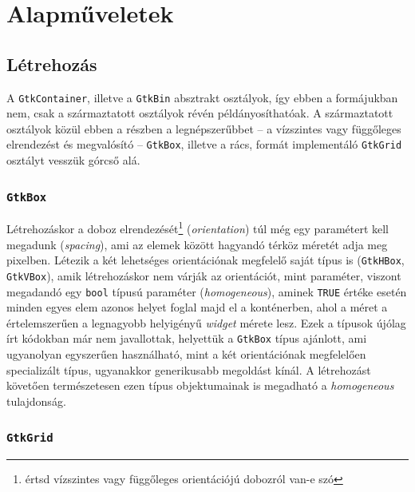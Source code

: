 \section{Alapműveletek}

\subsection{Létrehozás}

A \texttt{GtkContainer}, illetve a \texttt{GtkBin} absztrakt osztályok, így ebben a formájukban nem, csak a származtatott osztályok révén példányosíthatóak. A származtatott osztályok közül ebben a részben a legnépszerűbbet -- a vízszintes vagy függőleges elrendezést és megvalósító -- \texttt{GtkBox}, illetve a rács, formát implementáló \texttt{GtkGrid} osztályt vesszük górcső alá.

\subsubsection{\texttt{GtkBox}}

Létrehozáskor a doboz elrendezését\footnote{értsd vízszintes vagy függőleges orientációjú dobozról van-e szó} (\textit{orientation}) túl még egy paramétert kell megadunk (\textit{spacing}), ami az elemek között hagyandó térköz méretét adja meg pixelben. Létezik a két lehetséges orientációnak megfelelő saját típus is (\texttt{GtkHBox}, \texttt{GtkVBox}), amik létrehozáskor nem várják az orientációt, mint paraméter, viszont megadandó egy \texttt{bool} típusú paraméter (\textit{homogeneous}), aminek \texttt{TRUE} értéke esetén minden egyes elem azonos helyet foglal majd el a konténerben, ahol a méret a értelemszerűen a legnagyobb helyigényű \textit{widget} mérete lesz. Ezek a típusok újólag írt kódokban már nem javallottak, helyettük a \texttt{GtkBox} típus ajánlott, ami ugyanolyan egyszerűen használható, mint a két orientációnak megfelelően specializált típus, ugyanakkor generikusabb megoldást kínál. A létrehozást követően természetesen ezen típus objektumainak is megadható a \textit{homogeneous} tulajdonság.


\subsubsection{\texttt{GtkGrid}}

